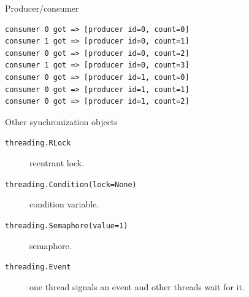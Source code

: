 \documentclass[xcolor=dvipsnames, 10pt, presentation,aspectratio=169]{beamer}
\begin{document}
\begin{frame}[label={sec:orgeb15a4c},fragile]{Producer/consumer}
 \begin{verbatim}
consumer 0 got => [producer id=0, count=0]
consumer 1 got => [producer id=0, count=1]
consumer 0 got => [producer id=0, count=2]
consumer 1 got => [producer id=0, count=3]
consumer 0 got => [producer id=1, count=0]
consumer 0 got => [producer id=1, count=1]
consumer 0 got => [producer id=1, count=2]
\end{verbatim}
\end{frame}

\begin{frame}[label={sec:org63d9b30},fragile]{Other synchronization objects}
 \begin{description}
\item[{\texttt{threading.RLock}}] reentrant lock.
\item[{\texttt{threading.Condition(lock=None)}}] condition variable.
\item[{\texttt{threading.Semaphore(value=1)}}] semaphore.
\item[{\texttt{threading.Event}}] one thread signals an event and other threads wait for it.
\end{description}
\end{frame}
\end{document}
